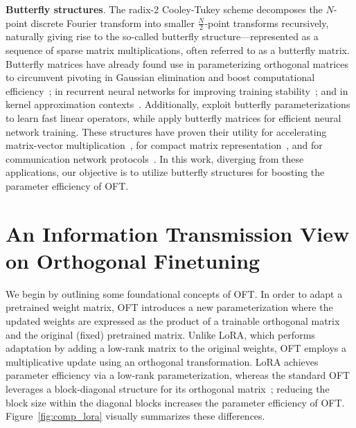 \textbf{Butterfly structures}. The radix-2 Cooley-Tukey scheme decomposes the $N$-point discrete Fourier transform into smaller $\frac{N}{2}$-point transforms recursively, naturally giving rise to the so-called butterfly structure—represented as a sequence of sparse matrix multiplications, often referred to as a butterfly matrix. Butterfly matrices have already found use in parameterizing orthogonal matrices to circumvent pivoting in Gaussian elimination and boost computational efficiency~\cite{parker1995random}; in recurrent neural networks for improving training stability~\cite{jing2017tunable}; and in kernel approximation contexts~\cite{munkhoeva2018quadrature}. Additionally, \cite{dao2019learning,dao2019kaleidoscope} exploit butterfly parameterizations to learn fast linear operators, while \cite{chen2022pixelated,dao2022monarch} apply butterfly matrices for efficient neural network training. These structures have proven their utility for accelerating matrix-vector multiplication~\cite{michielssen1996multilevel,o2010algorithm}, for compact matrix representation~\cite{li2015butterfly}, and for communication network protocols~\cite{klasing1994broadcasting,li2003linear,rajasingh2016transmission}. In this work, diverging from these applications, our objective is to utilize butterfly structures for boosting the parameter efficiency of OFT.

\section{An Information Transmission View on Orthogonal Finetuning}

We begin by outlining some foundational concepts of OFT. In order to adapt a pretrained weight matrix, OFT introduces a new parameterization where the updated weights are expressed as the product of a trainable orthogonal matrix and the original (fixed) pretrained matrix. Unlike LoRA, which performs adaptation by adding a low-rank matrix to the original weights, OFT employs a multiplicative update using an orthogonal transformation. LoRA achieves parameter efficiency via a low-rank parameterization, whereas the standard OFT leverages a block-diagonal structure for its orthogonal matrix~\cite{qiu2023controlling}; reducing the block size within the diagonal blocks increases the parameter efficiency of OFT. Figure~\ref{fig:comp_lora} visually summarizes these differences. 

